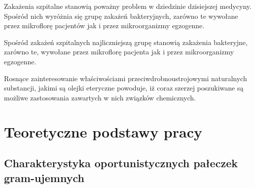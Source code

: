 \documentclass[11pt,a4paper]{report}
\begin{document}
Zakażenia szpitalne stanowią poważny problem w dziedzinie dzisiejszej medycyny. Spośród nich wyróżnia się grupę zakażeń bakteryjnych, zarówno te wywołane przez mikroflorę pacjentów jak i przez mikroorganizmy egzogenne. 



Spośród zakażeń szpitalnych najliczniejszą grupę stanowią zakażenia bakteryjne, zarówno te, wywołane przez mikroflorę pacjenta jak i przez mikroorganizmy egzogenne.\cite{zakszpit16}

Rosnące zainteresowanie właściwościami przeciwdrobnoustrojowymi naturalnych substancji, jakimi są olejki eteryczne powoduje, iż coraz szerzej poszukiwane są możliwe zastosowania zawartych w nich związków chemicznych. 
\cite{manukaikanuka}












\chapter{Teoretyczne podstawy pracy}
\section{Charakterystyka oportunistycznych pałeczek gram-ujemnych}
\end{document}
